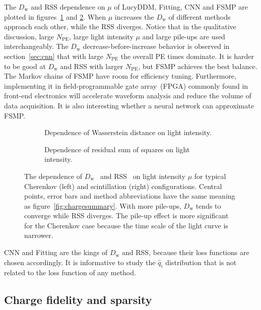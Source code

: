 The $D_\mathrm{w}$ and RSS dependence on $\mu$ of LucyDDM, Fitting, CNN and FSMP are plotted in figures~\ref{fig:wdistsummary} and \ref{fig:rsssummary}.  When $\mu$ increases the $D_\mathrm{w}$ of different methods approach each other, while the RSS diverges.  Notice that in the qualitative discussion, large $N_\mathrm{PE}$, large light intensity $\mu$ and large pile-ups are used interchangeably.  The $D_\mathrm{w}$ decrease-before-increase behavior is observed in section~\ref{sec:cnn} that with large $N_\mathrm{PE}$ the overall PE times dominate.  It is harder to be good at $D_\mathrm{w}$ and RSS with larger $N_\mathrm{PE}$, but FSMP achieves the best balance.  The Markov chains of FSMP have room for efficiency tuning.  Furthermore, implementing it in field-programmable gate array~(FPGA) commonly found in front-end electronics will accelerate waveform analysis and reduce the volume of data acquisition.  It is also interesting whether a neural network can approximate FSMP.
\begin{figure}[H]
  \begin{subfigure}[b]{\textwidth}
    \resizebox{\textwidth}{!}{}
    \caption{\label{fig:wdistsummary}Dependence of Wasserstein distance on light intensity.}
  \end{subfigure}

  \vspace{0.5em}
  \begin{subfigure}[b]{\textwidth}
    \resizebox{\textwidth}{!}{}
    \caption{\label{fig:rsssummary}Dependence of residual sum of squares on light intensity.}
  \end{subfigure}
  \caption{\label{fig:summary}The dependence of $D_\mathrm{w}$~ and RSS~ on light intensity $\mu$ for typical Cherenkov (left) and scintillation (right) configurations.  Central points, error bars and method abbreviations have the same meaning as figure~\ref{fig:chargesummary}.  With more pile-ups, $D_\mathrm{w}$ tends to converge while RSS diverges.  The pile-up effect is more significant for the Cherenkov case because the time scale of the light curve is narrower. }
\end{figure}

CNN and Fitting are the kings of $D_\mathrm{w}$ and RSS, because their loss functions are chosen accordingly.  It is informative to study the $\hat{q}_i$ distribution that is not related to the loss function of any method.

\subsection{Charge fidelity and sparsity}

